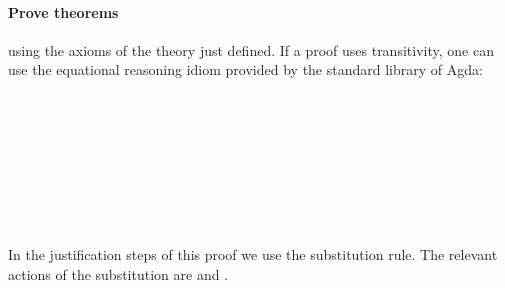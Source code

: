 \paragraph*{Prove theorems}
  using the axioms of the theory just defined.
  If a proof uses transitivity, one can use the equational reasoning
  idiom provided by the standard library of Agda:

  \begin{code}
    \>[2]\AgdaSpace{}%
\AgdaSymbol{:}%
\>[8]\AgdaSpace{}%
\AgdaSpace{}%
\AgdaSymbol{(}\AgdaSpace{}%
\AgdaSpace{}%
\AgdaSpace{}%
\AgdaSpace{}%
\AgdaSpace{}%
\AgdaSpace{}%
\AgdaSymbol{)}\<%
\\
%
\>[2]\AgdaSpace{}%
\AgdaSymbol{=}%
\>[503I]\<%
\\
\>[503I][@{}l@{\AgdaIndent{0}}]%
\>[9]\AgdaSpace{}%
\AgdaSpace{}%
\AgdaSpace{}%
\<%
\\
%
\>[9]\AgdaSpace{}%
\AgdaSpace{}%
\AgdaSpace{}%
\AgdaSpace{}%
\AgdaSpace{}%
\<%
\\
%
\>[9]\AgdaSpace{}%
\AgdaSpace{}%
\AgdaSpace{}%
\<%
\\
%
\>[9]\AgdaSpace{}%
\AgdaSpace{}%
\AgdaSpace{}%
\AgdaSpace{}%
\AgdaSpace{}%
\<%
\\
%
\>[9]\<%
\\
\>[.][@{}l@{}]\<[503I]%
\>[7]\<%
  \end{code}

\noindent In the justification steps of this proof we use the
substitution rule. The relevant actions of the substitution  are
\AgdaSpace{}\AgdaSpace{}\AgdaSymbol{=}
\AgdaSpace{} and
\AgdaSpace{}\AgdaSpace{}\AgdaSymbol{=}
.

